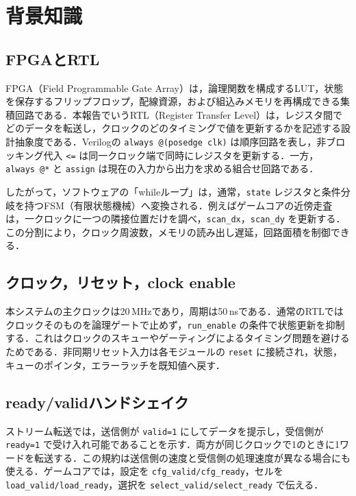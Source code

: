 \chapter{背景知識}
\label{ch:background}

\section{FPGAとRTL}
FPGA（Field Programmable Gate Array）は，論理関数を構成するLUT，状態を保存するフリップフロップ，配線資源，および組込みメモリを再構成できる集積回路である．本報告でいうRTL（Register Transfer Level）は，レジスタ間でどのデータを転送し，クロックのどのタイミングで値を更新するかを記述する設計抽象度である．Verilogの \texttt{always @(posedge clk)} は順序回路を表し，非ブロッキング代入 \texttt{<=} は同一クロック端で同時にレジスタを更新する．一方， \texttt{always @*} と \texttt{assign} は現在の入力から出力を求める組合せ回路である．

したがって，ソフトウェアの「whileループ」は，通常，\texttt{state} レジスタと条件分岐を持つFSM（有限状態機械）へ変換される．例えばゲームコアの近傍走査は，一クロックに一つの隣接位置だけを調べ，\texttt{scan\_dx}，\texttt{scan\_dy} を更新する．この分割により，クロック周波数，メモリの読み出し遅延，回路面積を制御できる．

\section{クロック，リセット，clock enable}
本システムの主クロックは20\,MHzであり，周期は50\,nsである．通常のRTLではクロックそのものを論理ゲートで止めず，\texttt{run\_enable} の条件で状態更新を抑制する．これはクロックのスキューやゲーティングによるタイミング問題を避けるためである．非同期リセット入力は各モジュールの \texttt{reset} に接続され，状態，キューのポインタ，エラーラッチを既知値へ戻す．

\section{ready/validハンドシェイク}
ストリーム転送では，送信側が \texttt{valid=1} にしてデータを提示し，受信側が \texttt{ready=1} で受け入れ可能であることを示す．両方が同じクロックで1のときに1ワードを転送する．この規約は送信側の速度と受信側の処理速度が異なる場合にも使える．ゲームコアでは，設定を \texttt{cfg\_valid/cfg\_ready}，セルを \texttt{load\_valid/load\_ready}，選択を \texttt{select\_valid/select\_ready} で伝える．


